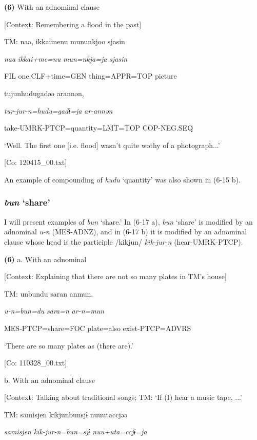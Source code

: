 \textbf{(6)}  With an adnominal clause

  [Context: Remembering a flood in the past]

  TM:  naa,  {\textbar}ikkaime{\textbar}nu  mununkjoo  sjasin

    \textit{naa}  \textit{ikkai+me=nu}  \textit{mun=nkja=ja}  \textit{sjasin}

    FIL  one.CLF+time=GEN  thing=APPR=TOP  picture

    tujunhudugadəə  arannən,

    \textit{tur-jur-n=hudu=gadɨ=ja}  \textit{ar-annən}

    take-UMRK-PTCP=quantity=LMT=TOP  COP-NEG.SEQ

    ‘Well. The first one [i.e. flood] wasn’t quite wothy of a photograph...’

    [Co: 120415\_00.txt]

An example of compounding of \textit{hudu} ‘quantity’ was also shown in (6-15 b).

\subsubsection{\textit{bun} ‘share’}

I will present examples of \textit{bun} ‘share.’ In (6-17 a), \textit{bun} ‘share’ is modified by an adnominal \textit{u-n} (MES-ADNZ), and in (6-17 b) it is modified by an adnominal clause whose head is the participle /kikjun/ \textit{kik-jur-n} (hear-UMRK-PTCP).

\textbf{(6)}  a.  With an adnominal

    [Context: Explaining that there are not so many plates in TM’s house]

    TM:  unbundu  saran  anmun.

      \textit{u-n=bun=du}  \textit{sara=n}  \textit{ar-n=mun}

      MES-PTCP=share=FOC  plate=also  exist-PTCP=ADVRS

      ‘There are so many plates as (there are).’

      [Co: 110328\_00.txt]

  b.  With an adnominal clause

    [Context: Talking about traditional songs; TM: ‘If (I) hear a music tape, ...’

    TM:  samisjen  kikjunbunsjɨ  nuuutaccjəə

      \textit{samisjen}  \textit{kik-jur-n=bun=sjɨ}  \textit{nuu+uta=ccjɨ=ja}

